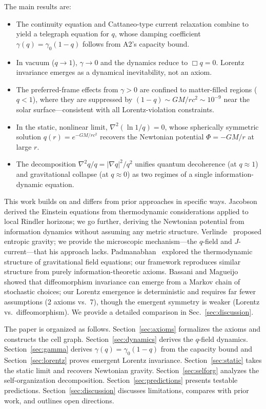 \documentclass[aps,prd,twocolumn,showpacs,superscriptaddress,preprintnumbers]{revtex4-2}
\begin{document}
The main results are:

\begin{itemize}
    \item The continuity equation and Cattaneo-type current relaxation combine to yield a telegraph equation for $q$, whose damping coefficient $\gamma(q)=\gamma_0(1-q)$ follows from A2's capacity bound.
    \item In vacuum ($q\to1$), $\gamma\to0$ and the dynamics reduce to $\Box q=0$. Lorentz invariance emerges as a dynamical inevitability, not an axiom.
    \item The preferred-frame effects from $\gamma>0$ are confined to matter-filled regions ($q<1$), where they are suppressed by $(1-q)\sim GM/rc^2\sim10^{-9}$ near the solar surface---consistent with all Lorentz-violation constraints.
    \item In the static, nonlinear limit, $\nabla^2(\ln 1/q)=0$, whose spherically symmetric solution $q(r)=e^{-GM/rc^2}$ recovers the Newtonian potential $\Phi=-GM/r$ at large $r$.
    \item The decomposition $\nabla^2 q/q=|\nabla q|^2/q^2$ unifies quantum decoherence (at $q\approx1$) and gravitational collapse (at $q\approx0$) as two regimes of a single information-dynamic equation.
\end{itemize}

This work builds on and differs from prior approaches in specific ways.
Jacobson~\cite{Jacobson:1995ab} derived the Einstein equations from thermodynamic considerations applied to local Rindler horizons; we go further, deriving the Newtonian potential from information dynamics without assuming any metric structure.
Verlinde~\cite{Verlinde:2010hp} proposed entropic gravity; we provide the microscopic mechanism---the $q$-field and $J$-current---that his approach lacks.
Padmanabhan~\cite{Padmanabhan:2010} explored the thermodynamic structure of gravitational field equations; our framework reproduces similar structure from purely information-theoretic axioms.
Bassani and Magueijo~\cite{Bassani:2025htma} showed that diffeomorphism invariance can emerge from a Markov chain of stochastic choices; our Lorentz emergence is deterministic and requires far fewer assumptions (2 axioms vs.\ 7), though the emergent symmetry is weaker (Lorentz vs.\ diffeomorphism).
We provide a detailed comparison in Sec.~\ref{sec:discussion}.

The paper is organized as follows.
Section~\ref{sec:axioms} formalizes the axioms and constructs the cell graph.
Section~\ref{sec:dynamics} derives the $q$-field dynamics.
Section~\ref{sec:gamma} derives $\gamma(q)=\gamma_0(1-q)$ from the capacity bound and Section~\ref{sec:lorentz} proves emergent Lorentz invariance.
Section~\ref{sec:static} takes the static limit and recovers Newtonian gravity.
Section~\ref{sec:selforg} analyzes the self-organization decomposition.
Section~\ref{sec:predictions} presents testable predictions.
Section~\ref{sec:discussion} discusses limitations, compares with prior work, and outlines open directions.
\end{document}
